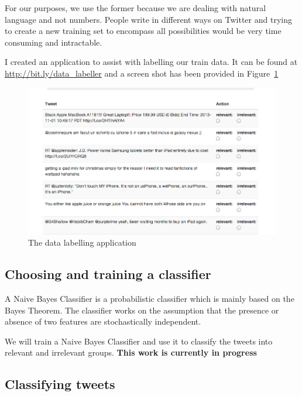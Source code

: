 For our purposes, we use the former because we are dealing with natural language and not numbers.
People write in different ways on Twitter and trying to create a new training set to encompass all
possibilities would be very time consuming and intractable.

I created an application to assist with labelling our train data. It can be found at
\url{http://bit.ly/data\_labeller} and a screen shot has been provided in Figure~\ref{fig:labeller}

\begin{figure}
  \begin{center}
    \includegraphics[scale=0.4]{figures/datalabeller}
  \end{center}
  \caption{The data labelling application}
\label{fig:labeller}
\end{figure}


\subsection{Choosing and training a classifier}
A Naive Bayes Classifier is a probabilistic classifier which is mainly based on the Bayes Theorem.
The classifier works on the assumption that the presence or absence of two features are
stochastically independent.

We will train a Naive Bayes Classifier and use it to classify the tweets into relevant and
irrelevant groups. \textbf{This work is currently in progress}

\subsection{Classifying tweets}

